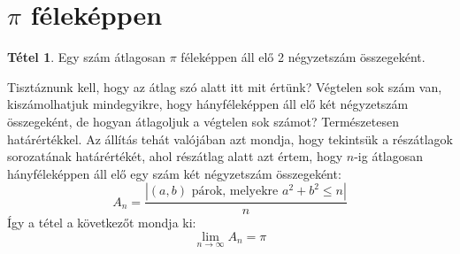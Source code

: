 \documentclass[12pt]{book}
\theoremstyle{plain} %
\theoremstyle{definition} %
\newtheorem{theo/}{Tétel}[section]
\newenvironment{theo}
  {\renewcommand{\qedsymbol}{$\clubsuit$}%
   \pushQED{\qed}\begin{theo/}}
  {\popQED\end{theo/}}
\theoremstyle{remark}
\renewcommand\qedsymbol{$\blacksquare$}
\numberwithin{equation}{section}  %
\begin{document}
	\section{$\pi$ féleképpen}
	
	\begin{theo}
		Egy szám átlagosan $\pi$ féleképpen áll elő 2 négyzetszám összegeként.
	\end{theo}

	Tisztáznunk kell, hogy az átlag szó alatt itt mit értünk? Végtelen sok szám van, kiszámolhatjuk mindegyikre, hogy hányféleképpen áll elő két négyzetszám összegeként, de hogyan átlagoljuk a végtelen sok számot? Természetesen határértékkel. Az állítás tehát valójában azt mondja, hogy tekintsük a részátlagok sorozatának határértékét, ahol részátlag alatt azt értem, hogy $n$-ig átlagosan hányféleképpen áll elő egy szám két négyzetszám összegeként:
	\[ A_n = \dfrac{|(a,b) \text{ párok, melyekre } a^2+b^2\leq n|}{n}  \]
	Így a tétel a következőt mondja ki:
	\[ \lim\limits_{n\to \infty} A_n = \pi  \]
\end{document}
